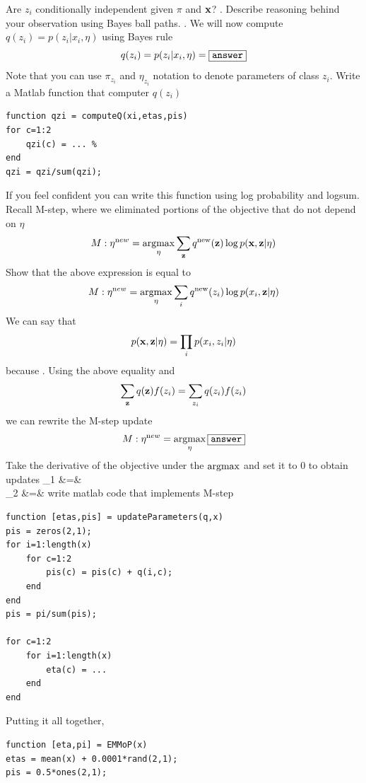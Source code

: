 \documentclass{article}
\begin{document}
{\begin{center}
\end{center}
Are $z_i$ conditionally independent given $\pi$ and $\mathbf{x}$? \answer.
Describe reasoning behind your observation using Bayes ball paths. \answer.
\newproblem{1pt} We will now compute $q(z_i) = p(z_i | x_i,\eta)$ using Bayes rule
\[
q(z_i) = p(z_i | x_i,\eta) = \fbox{\tt answer}
\]
Note that you can use $\pi_{z_i}$ and $\eta_{z_i}$ notation to denote parameters of class $z_i$.
Write a Matlab function that computer $q(z_i)$
\begin{verbatim}
function qzi = computeQ(xi,etas,pis)
for c=1:2
    qzi(c) = ... %
end
qzi = qzi/sum(qzi);
\end{verbatim}
If you feel confident you can write this function using log probability and logsum.
\newproblem{1pt} Recall M-step, where we eliminated portions of the objective that do not depend on $\eta$
\[
M: \eta^{\textrm new} = \mathop{\rm argmax}_\eta  \sum_{\mathbf{z}} q^{\textrm{new}}(\mathbf{z}) \log p(\mathbf{x},\mathbf{z}|\eta)
\]
Show that the above expression is equal to
\[
M: \eta^{\textrm new} = \mathop{\rm argmax}_\eta  \sum_i q^{\textrm{new}}(z_i)\log p(x_i,\mathbf{z}|\eta)
\]
We can say that
\[
p(\mathbf{x},\mathbf{z}|\eta) = \prod_i p(x_i,z_i|\eta)
\]
because \answer.
Using the above equality and
\[
\sum_{\mathbf{z}} q(\mathbf{z}) f(z_i) = \sum_{z_i} q(z_i) f(z_i)
\]
we can rewrite the M-step update
\[
M: \eta^{\textrm new} = \mathop{\rm argmax}_\eta  \fbox{\tt answer}
\]
Take the derivative of the objective under the  $\mathop{\rm argmax}$ and set it to $0$ to obtain updates
\BEAS
\eta_1 &=& \answer\\
\eta_2 &=& \answer
\EEAS
write matlab code that implements M-step
\begin{verbatim}
function [etas,pis] = updateParameters(q,x)
pis = zeros(2,1);
for i=1:length(x)
    for c=1:2
        pis(c) = pis(c) + q(i,c);
    end
end
pis = pi/sum(pis);

for c=1:2
    for i=1:length(x)
        eta(c) = ...
    end
end
\end{verbatim}


\newproblem{2pt} Putting it all together,
\begin{verbatim}
function [eta,pi] = EMMoP(x)
etas = mean(x) + 0.0001*rand(2,1);
pis = 0.5*ones(2,1);


\end{verbatim}}
\end{document}
